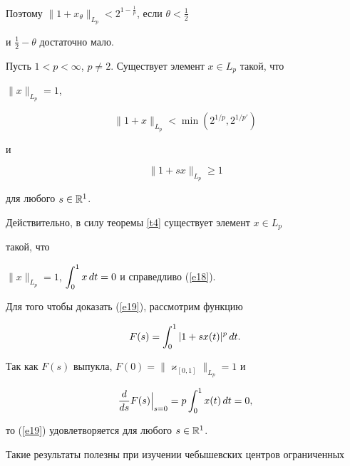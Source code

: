 Поэтому $\|1 + x_\theta\|_{L_p} < 2^{1- \frac 1 p}$, если $\theta<\frac 1 2$ 


и $\frac 1 2 -\theta $ достаточно мало. 





\begin{cor}\label{c1}


Пусть $1 < p < \infty$, $p \ne 2$. Существует элемент $x\in L_p$ такой, что


$\|x\|_{L_p} =1$, 


\begin{equation}\label{e18}


\|1+x\|_{L_p} < \min ( 2^{1/p}, 2^{1/p'})


\end{equation}


и 


\begin{equation}\label{e19}


\|1+ sx\|_{L_p} \ge 1


\end{equation}


для любого $s\in \Bbb R^1$. 


\end{cor}





Действительно, в силу теоремы \ref{t4} существует элемент $x\in L_p$


такой, что


$\|x\|_{L_p}=1$, $\displaystyle\int_{0}^{1}x\, dt =0$ и справедливо (\ref{e18}). 


Для того чтобы доказать (\ref{e19}), рассмотрим функцию


$$


F(s) =\intl{0}{1} |1 + sx(t) |^p \, dt. 


$$


Так как $F(s)$ выпукла, $F(0) = \|\varkappa_{[0, 1]} \|_{L_p} =1$ и


$$


\frac d{ds} F(s)\Big|_{s=0} = p


\intl{0}{1} x(t) \, dt =0, 


$$


то (\ref{e19}) удовлетворяется для любого $s\in \Bbb R^1$. 





Такие результаты полезны при изучении чебышевских центров ограниченных 


